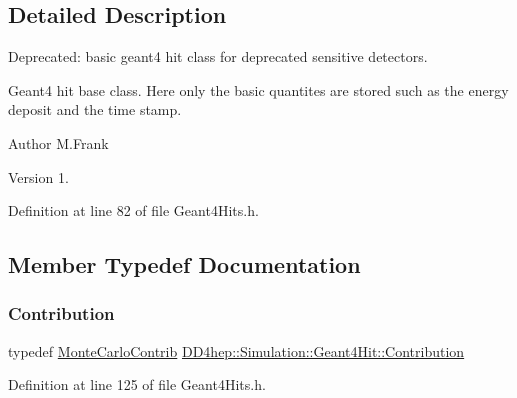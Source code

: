 \subsection{Detailed Description}
Deprecated\+: basic geant4 hit class for deprecated sensitive detectors. 

Geant4 hit base class. Here only the basic quantites are stored such as the energy deposit and the time stamp.

\begin{DoxyAuthor}{Author}
M.\+Frank 
\end{DoxyAuthor}
\begin{DoxyVersion}{Version}
1. 
\end{DoxyVersion}


Definition at line 82 of file Geant4\+Hits.\+h.



\subsection{Member Typedef Documentation}
\hypertarget{class_d_d4hep_1_1_simulation_1_1_geant4_hit_a03a5270c4d1410302fe278ce6a47f268}{}\label{class_d_d4hep_1_1_simulation_1_1_geant4_hit_a03a5270c4d1410302fe278ce6a47f268} 
\subsubsection{\texorpdfstring{Contribution}{Contribution}}
{\footnotesize\ttfamily typedef \hyperlink{struct_d_d4hep_1_1_simulation_1_1_geant4_hit_1_1_monte_carlo_contrib}{Monte\+Carlo\+Contrib} \hyperlink{class_d_d4hep_1_1_simulation_1_1_geant4_hit_a03a5270c4d1410302fe278ce6a47f268}{D\+D4hep\+::\+Simulation\+::\+Geant4\+Hit\+::\+Contribution}}



Definition at line 125 of file Geant4\+Hits.\+h.

\hypertarget{class_d_d4hep_1_1_simulation_1_1_geant4_hit_acdc278ce7e641d337b024d5fc8f52a2c}{}\label{class_d_d4hep_1_1_simulation_1_1_geant4_hit_acdc278ce7e641d337b024d5fc8f52a2c} 
